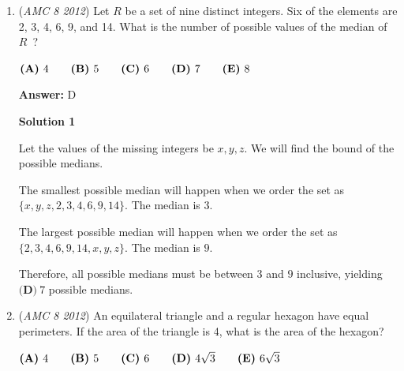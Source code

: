 \begin{enumerate}
 \textbf{Answer: }D



\textbf{Solution}

If Marla evenly distributes her $300$ square feet of paint between the 6 faces, each face will get $300\div6 = 50$ square feet of paint. The surface area of one of the faces of the cube is $10^2 = 100$ square feet. Therefore, there will be $100-50 = \boxed{\textbf{(D)}\ 50}$ square feet of white on each side.

 


	\item (\textit{AMC 8 2012}) Let $R$  be a set of nine distinct integers. Six of the elements are 2, 3, 4, 6, 9, and 14. What is the number of possible values of the median of $R$ ?


 $\textbf{(A)}\hspace{.05in}4\qquad\textbf{(B)}\hspace{.05in}5\qquad\textbf{(C)}\hspace{.05in}6\qquad\textbf{(D)}\hspace{.05in}7\qquad\textbf{(E)}\hspace{.05in}8$

 \textbf{Answer: }D



\textbf{Solution 1}

Let the values of the missing integers be $x, y, z$. We will find the bound of the possible medians. 

 The smallest possible median will happen when we order the set as $\{x, y, z, 2, 3, 4, 6, 9, 14\}$. The median is $3$. 

 The largest possible median will happen when we order the set as $\{2, 3, 4, 6, 9, 14, x, y, z\}$. The median is $9$.

 Therefore, all possible medians must be between $3$ and $9$ inclusive, yielding $\boxed{\textbf{(D)}\ 7}$ possible medians.

 


	\item (\textit{AMC 8 2012}) An equilateral triangle and a regular hexagon have equal perimeters. If the area of the triangle is 4, what is the area of the hexagon?


 $\textbf{(A)}\hspace{.05in}4\qquad\textbf{(B)}\hspace{.05in}5\qquad\textbf{(C)}\hspace{.05in}6\qquad\textbf{(D)}\hspace{.05in}4\sqrt3\qquad\textbf{(E)}\hspace{.05in}6\sqrt3$


\end{enumerate}
